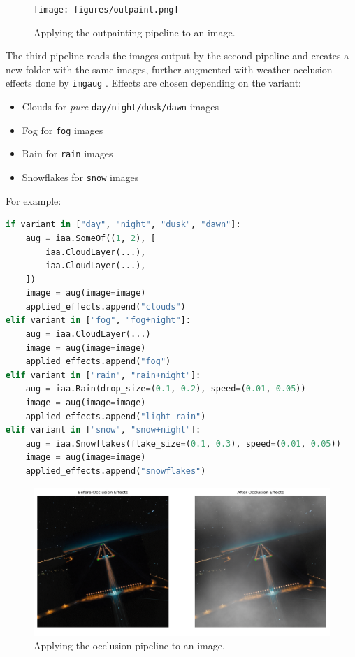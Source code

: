 \begin{figure}[htbp]
\centering
\texttt{[image: figures/outpaint.png]}
  \caption{Applying the outpainting pipeline to an image.}
\end{figure}

The third pipeline reads the images output by the second pipeline and creates a new folder with the same images, further augmented with weather occlusion effects done by \texttt{imgaug} \cite{jung_imgaug_2020}. 
Effects are chosen depending on the variant:

\begin{itemize}
\item Clouds for \emph{pure} \texttt{day/night/dusk/dawn} images
\item Fog for \texttt{fog} images
\item Rain for \texttt{rain} images
\item Snowflakes for \texttt{snow} images
\end{itemize}

For example:

\begin{lstlisting}[language=Python, caption={Variant image generation module,
\texttt{imgaug} pipeline}]
if variant in ["day", "night", "dusk", "dawn"]:
    aug = iaa.SomeOf((1, 2), [
        iaa.CloudLayer(...),
        iaa.CloudLayer(...),
    ])
    image = aug(image=image)
    applied_effects.append("clouds")
elif variant in ["fog", "fog+night"]:
    aug = iaa.CloudLayer(...)
    image = aug(image=image)
    applied_effects.append("fog")
elif variant in ["rain", "rain+night"]:
    aug = iaa.Rain(drop_size=(0.1, 0.2), speed=(0.01, 0.05))
    image = aug(image=image)
    applied_effects.append("light_rain")
elif variant in ["snow", "snow+night"]:
    aug = iaa.Snowflakes(flake_size=(0.1, 0.3), speed=(0.01, 0.05))
    image = aug(image=image)
    applied_effects.append("snowflakes")
\end{lstlisting}

\begin{figure}[htbp]
\centering
\includegraphics[width=1.0\textwidth]{figures/occlusion.png}
  \caption{Applying the occlusion pipeline to an image.}
\end{figure}


